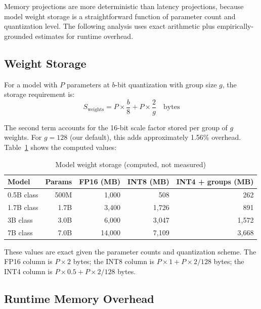 \documentclass[12pt, letterpaper, twoside]{report}
\begin{document}
Memory projections are more deterministic than latency projections, because model weight storage is a straightforward function of parameter count and quantization level. The following analysis uses exact arithmetic plus empirically-grounded estimates for runtime overhead.

\subsection{Weight Storage}
\label{subsec:weight_storage}

For a model with $P$ parameters at $b$-bit quantization with group size $g$, the storage requirement is:
\begin{equation}
S_{\text{weights}} = P \times \frac{b}{8} + P \times \frac{2}{g} \quad \text{bytes}
\label{eq:storage}
\end{equation}

The second term accounts for the 16-bit scale factor stored per group of $g$ weights. For $g = 128$ (our default), this adds approximately 1.56\% overhead. Table~\ref{tab:storage} shows the computed values:

\begin{table}[H]
\centering
\caption{Model weight storage (computed, not measured)}
\label{tab:storage}
\begin{tabular}{@{}lrrrr@{}}
\toprule
\textbf{Model} & \textbf{Params} & \textbf{FP16 (MB)} & \textbf{INT8 (MB)} & \textbf{INT4 + groups (MB)} \\
\midrule
0.5B class & 500M & 1{,}000 & 508 & 262 \\
1.7B class & 1.7B & 3{,}400 & 1{,}726 & 891 \\
3B class   & 3.0B & 6{,}000 & 3{,}047 & 1{,}572 \\
7B class   & 7.0B & 14{,}000 & 7{,}109 & 3{,}668 \\
\bottomrule
\end{tabular}
\end{table}

These values are exact given the parameter counts and quantization scheme. The FP16 column is $P \times 2$ bytes; the INT8 column is $P \times 1 + P \times 2/128$ bytes; the INT4 column is $P \times 0.5 + P \times 2/128$ bytes.

\subsection{Runtime Memory Overhead}
\label{subsec:runtime_overhead}
\end{document}
